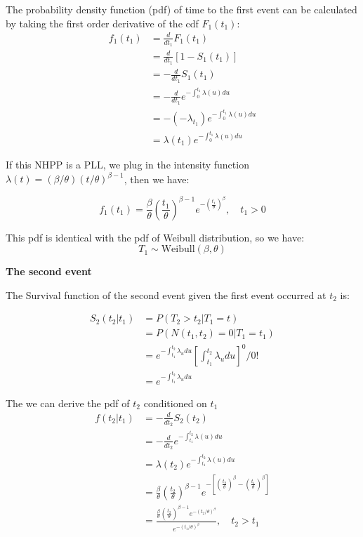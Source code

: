 \documentclass[12pt]{book}
\numberwithin{equation}{chapter}
\begin{document}
The probability density function (pdf) of time to the first event can be calculated by taking the first order derivative of the cdf \(F_1(t_1)\):
\begin{align*}
f_1(t_1) & = \frac{d}{dt_1}F_1(t_1)\\
& = \frac{d}{dt_1}[1 - S_1(t_1)] \\
& = - \frac{d}{dt_1}S_1(t_1)\\
& = - \frac{d}{dt_1}e^{-\int_{0}^{t_1}\lambda (u)du}\\
& = -(-\lambda_{t_1})e^{-\int_{0}^{t_1}\lambda (u)du}\\
& = \lambda (t_1)e^{-\int_{0}^{t_1}\lambda (u)du}
\end{align*}

If this NHPP is a PLL, we plug in the intensity function \(\lambda(t) = (\beta / \theta)(t/\theta)^{\beta - 1}\), then we have:

\[f_1(t_1) = \frac{\beta}{\theta}(\frac{t_1}{\theta})^{\beta - 1}e^{-(\frac{t_1}{\theta})^\beta}, \quad t_1 > 0\]

This pdf is identical with the pdf of Weibull distribution, so we have:
\[T_1 \sim \text{Weibull}(\beta, \theta)\]

\textbf{The second event}

The Survival function of the second event given the first event occurred at \(t_2\) is:

\begin{align*}
S_2(t_2 | t_1) & = P(T_2 > t_2 | T_1 = t)\\
& = P(N(t_1, t_2) = 0|T_1 = t_1) \\
& = e^{-\int_{t_1}^{t_2}\lambda_{u}du}[\int_{t_1}^{t_2}\lambda_{u}du]^0/0!\\
& = e^{-\int_{t_1}^{t_2}\lambda_{u}du}
\end{align*}

The we can derive the pdf of \(t_2\) conditioned on \(t_1\)
\begin{equation}\label{t2}
\begin{aligned}
f(t_2|t_1) & = - \frac{d}{dt_2}S_2(t_2)\\
& = - \frac{d}{dt_2}e^{-\int_{t_1}^{t_2}\lambda(u)du}\\
& = \lambda(t_2)e^{-\int_{t_1}^{t_2}\lambda(u)du}\\
& = \frac{\beta}{\theta}(\frac{t_2}{\theta})^{\beta - 1}e^{-[(\frac{t_2}{\theta})^\beta - (\frac{t_1}{\theta})^\beta]}\\
& = \frac{\frac{\beta}{\theta}(\frac{t_2}{\theta})^{\beta - 1}e^{-(t_2/\theta)^\beta }}{e^{- (t_1/\theta)^\beta}}, \quad t_2 > t_1
\end{aligned}
\end{equation}
\end{document}
